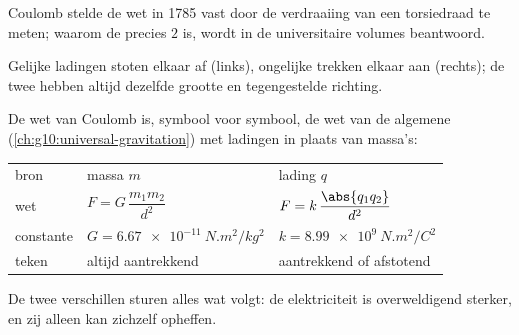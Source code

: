 \begin{remark}\label{rem:g11:fundamental-interactions:torsion}
Coulomb stelde de wet in 1785 vast door de verdraaiing van een 
torsiedraad te meten; waarom de  precies $2$ is, wordt in de
universitaire volumes beantwoord.
\end{remark}

\begin{omfigure}
\qquad
{}

{\small Gelijke ladingen stoten elkaar af (links), ongelijke trekken
elkaar aan (rechts); de twee  hebben altijd dezelfde grootte en
tegengestelde richting.}
\end{omfigure}

\begin{remark}\label{rem:g11:fundamental-interactions:twin}
De wet van Coulomb is, symbool voor symbool, de wet van de algemene
 (\cref{ch:g10:universal-gravitation}) met ladingen in plaats
van massa's:
\begin{center}
\begin{tabular}{lll}
bron & massa $m$ & lading $q$ \\
wet & $F = G\,\dfrac{m_1 m_2}{d^2}$ & $F = k\,\dfrac{\abs{q_1 q_2}}{d^2}$ \\[1.5ex]
constante & $G = \qty{6.67e-11}{N.m^2/kg^2}$ & $k = \qty{8.99e9}{N.m^2/C^2}$ \\
teken & altijd aantrekkend & aantrekkend of afstotend \\
\end{tabular}
\end{center}
De twee verschillen sturen alles wat volgt: de elektriciteit is
overweldigend sterker, en zij alleen kan zichzelf opheffen.
\end{remark}

